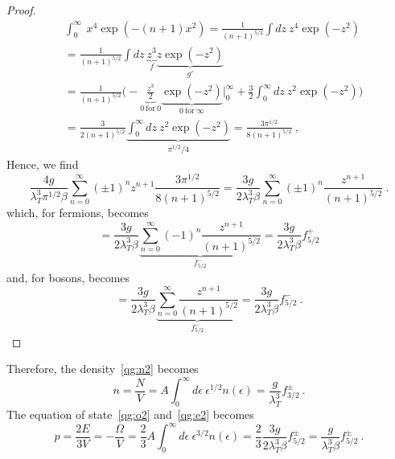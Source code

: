 \begin{proof}
\begin{equation*}
\begin{aligned}
            & \int_0^\infty ~ x^4 \exp(-(n + 1) x^2) = \frac{1}{(n+1)^{5/2}} \int dz ~ z^4 \exp(-z^2) \\ & = \frac{1}{(n+1)^{5/2}} \int dz ~ \underbrace{z^3}_f \underbrace{z \exp(-z^2)}_{g'} \\ & = \frac{1}{(n+1)^{5/2}} \Big ( - \underbrace{\frac{z^3}{2}}_{0~\text{for}~0} \underbrace{\exp(-z^2)}_{0~\text{for}~\infty} \Big \vert_0^\infty + \frac{3}{2} \int_0^\infty dz ~ z^2 \exp(- z^2) \Big) \\ & = \frac{3}{2(n+1)^{5/2}} \underbrace{\int_0^\infty dz ~ z^2 \exp(- z^2)}_{\pi^{1/2} / 4} = \frac{3 \pi^{1/2}}{8 (n+1)^{5/2}} ~,
        \end{aligned}
        \end{equation*}
        Hence, we find
        \begin{equation*}
            \frac{4 g}{\lambda_T^3 \pi^{1/2}\beta} \sum_{n=0}^\infty (\pm 1)^n z^{n+1} \frac{3 \pi^{1/2}}{8 (n+1)^{5/2}} = \frac{3g}{2\lambda_T^3 \beta} \sum_{n=0}^\infty (\pm 1)^n \frac{z^{n+1}}{(n+1)^{5/2}} ~.
        \end{equation*}
        which, for fermions, becomes 
        \begin{equation*}
            = \frac{3g}{2\lambda_T^3\beta} \underbrace{\sum_{n=0}^\infty (- 1)^n \frac{z^{n+1}}{(n+1)^{5/2}}}_{f^-_{5/2}} = \frac{3g}{2\lambda_T^3 \beta} f^+_{5/2} 
        \end{equation*}
        and, for bosons, becomes
        \begin{equation*}
            = \frac{3g}{2\lambda_T^3 \beta} \underbrace{\sum_{n=0}^\infty \frac{z^{n+1}}{(n+1)^{5/2}}}_{f^-_{5/2}} = \frac{3g}{2\lambda_T^3\beta} f^-_{5/2} ~.
        \end{equation*}
    \end{proof}

    Therefore, the density~\eqref{qg:n2} becomes
    \begin{equation}\label{qg:n3}
        n = \frac{N}{V} = A \int_0^\infty d\epsilon ~ \epsilon^{1/2} n(\epsilon) = \frac{g}{\lambda_T^3} f_{3/2}^\pm ~.
    \end{equation}
    The equation of state~\eqref{qg:o2} and~\eqref{qg:e2} becomes 
    \begin{equation}\label{qg:p}
        p = \frac{2E}{3V} = - \frac{\Omega}{V} = \frac{2}{3} A \int_0^\infty d\epsilon ~ \epsilon^{3/2} n(\epsilon) = \frac{2}{3} \frac{3g}{2\lambda_T^3 \beta} f_{5/2}^\pm = \frac{g}{\lambda_T^3 \beta} f_{5/2}^\pm ~.
    \end{equation}

